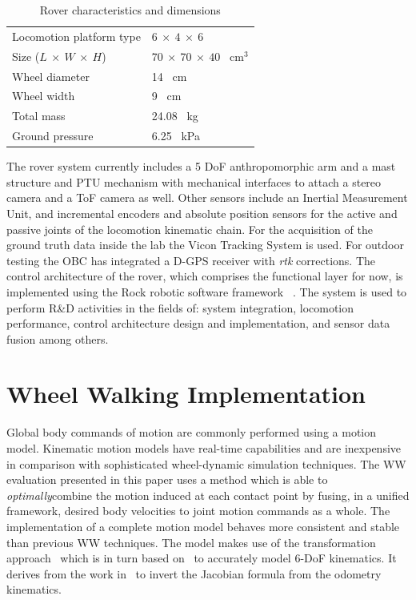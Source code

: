 \documentclass[a4paper,twocolumn]{esapub2005} %
\begin{document}
\begin{table}[h]
	\begin{tabular}{ll}
	Locomotion platform type       & $6~\times~4~\times~6$             \\
	Size ($L~\times~W~\times~H$)   & $70~\times~70~\times~40$ ~\unit{cm$^3$} \\
	Wheel diameter                 & 14 ~\unit{cm}    \\
	Wheel width                    & 9 ~\unit{cm}     \\
	Total mass                     & 24.08 ~\unit{kg} \\
	Ground pressure                & 6.25 ~\unit{kPa}        
	\end{tabular}
	\caption{Rover characteristics and dimensions}
	\label{tab:ExoterDimensionsTable}
\end{table}

The rover system currently includes a 5 DoF anthropomorphic arm and a mast
structure and PTU mechanism with mechanical interfaces to attach a stereo
camera and a ToF camera as well. Other sensors include an Inertial Measurement
Unit, and incremental encoders and absolute position sensors for the active and
passive joints of the locomotion kinematic chain. For the acquisition of the
ground truth data inside the lab the Vicon Tracking System is used. For outdoor
testing the OBC has integrated a D-GPS receiver with \textit{rtk} corrections.
The control architecture of the rover, which comprises the functional layer for
now, is implemented using the Rock robotic software framework ~\cite{}. The
system is used to perform R\&D activities in the fields of: system integration,
locomotion performance, control architecture design and implementation, and
sensor data fusion among others. 

\section{Wheel Walking Implementation}

Global body commands of motion are commonly performed using a motion model.
Kinematic motion models have real-time capabilities and are inexpensive in
comparison with sophisticated wheel-dynamic simulation techniques.  The
WW evaluation presented in this paper uses a method which is able to
\textit{optimally}\footnotemark[1] combine the motion induced at each contact
point by fusing, in a unified framework, desired body velocities to joint 
motion commands as a whole.  The implementation of a complete motion model 
behaves more consistent and stable than previous WW techniques. The model makes 
use of the transformation approach~\cite{Tarokh2005} which is in turn based 
on~\cite{MuirNeumann1987} to accurately model 6-DoF kinematics. It derives from 
the work in~\cite{Hidalgo-Carrio2014} to invert the Jacobian formula from the 
odometry kinematics.
\end{document}
